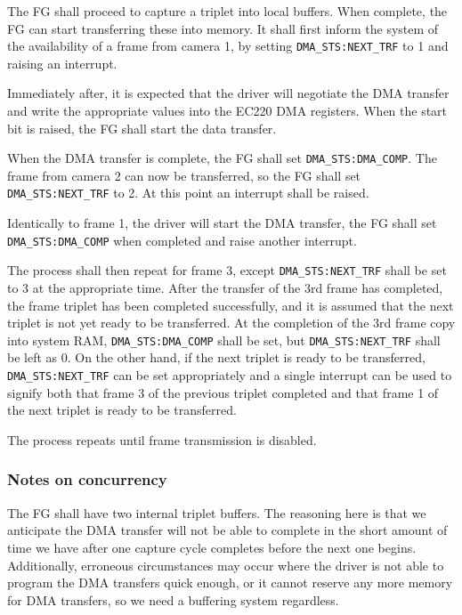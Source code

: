 \documentclass[12pt]{article}
\begin{document}
The FG shall proceed to capture a triplet into local buffers. When complete, the FG can start transferring these into memory. It shall first inform the system of the availability of a frame from camera 1, by setting \texttt{DMA\_STS:NEXT\_TRF} to 1 and raising an interrupt.

Immediately after, it is expected that the driver will negotiate the DMA transfer and write the appropriate values into the EC220 DMA registers. When the start bit is raised, the FG shall start the data transfer.

When the DMA transfer is complete, the FG shall set \texttt{DMA\_STS:DMA\_COMP}. The frame from camera 2 can now be transferred, so the FG shall set \texttt{DMA\_STS:NEXT\_TRF} to 2. At this point an interrupt shall be raised.

Identically to frame 1, the driver will start the DMA transfer, the FG shall set \texttt{DMA\_STS:DMA\_COMP} when completed and raise another interrupt.

The process shall then repeat for frame 3, except \texttt{DMA\_STS:NEXT\_TRF} shall be set to 3 at the appropriate time. After the transfer of the 3rd frame has completed, the frame triplet has been completed successfully, and it is assumed that the next triplet is not yet ready to be transferred. At the completion of the 3rd frame copy into system RAM, \texttt{DMA\_STS:DMA\_COMP} shall be set, but \texttt{DMA\_STS:NEXT\_TRF} shall be left as 0. On the other hand, if the next triplet is ready to be transferred, \texttt{DMA\_STS:NEXT\_TRF} can be set appropriately and a single interrupt can be used to signify both that frame 3 of the previous triplet completed and that frame 1 of the next triplet is ready to be transferred.

The process repeats until frame transmission is disabled.

\subsubsection{Notes on concurrency}

The FG shall have two internal triplet buffers. The reasoning here is that we anticipate the DMA transfer will not be able to complete in the short amount of time we have after one capture cycle completes before the next one begins. Additionally, erroneous circumstances may occur where the driver is not able to program the DMA transfers quick enough, or it cannot reserve any more memory for DMA transfers, so we need a buffering system regardless.
\end{document}

